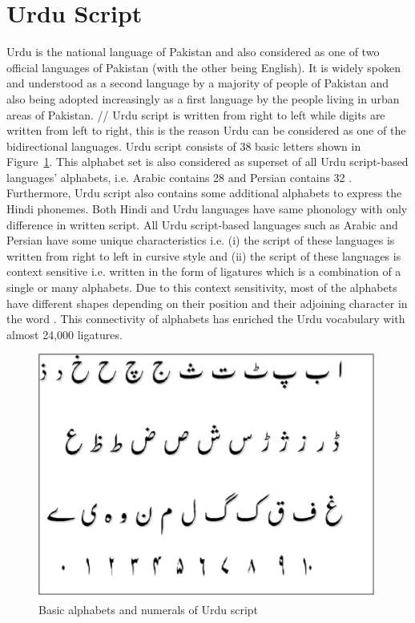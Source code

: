 \documentclass[a4paper,conference]{IEEEtran}
\begin{document}
\section{Urdu Script}\label{UrduSC}
Urdu is the national language of Pakistan and also considered as one of two official languages of Pakistan \cite{60} (with the other being English). It is widely spoken and understood as a second language by a majority of people of Pakistan \cite{1,2} and also being adopted increasingly as a first language by the people living in urban areas of Pakistan. //
Urdu script is written from right to left while digits are written from left to right, this is the reason Urdu can be considered as one of the bidirectional languages. Urdu script consists of 38 basic letters shown in Figure~\ref{fig1}. This alphabet set is also considered as superset of all Urdu script-based languages’ alphabets, i.e. Arabic contains 28 and Persian contains 32 \cite{4}. Furthermore, Urdu script also contains some additional alphabets to express the Hindi phonemes. Both Hindi and Urdu languages \cite{4} have same phonology with only difference in written script. All Urdu script-based languages such as Arabic and Persian have some unique characteristics i.e. (i) the script of these languages is written from right to left in cursive style and (ii) the script of these languages is context sensitive i.e. written in the form of ligatures which is a combination of a single or many alphabets. Due to this context sensitivity, most of the alphabets have different shapes depending on their position and their adjoining character in the word \cite{5}. This connectivity of alphabets \cite{6} has enriched the Urdu vocabulary with almost 24,000 ligatures. \\
\begin{figure}
\centering
	\includegraphics[width=8.cm]{Urdu_alphabets.jpg}
\caption{Basic alphabets and numerals of Urdu script}\label{fig1}
\end{figure}
\end{document}
